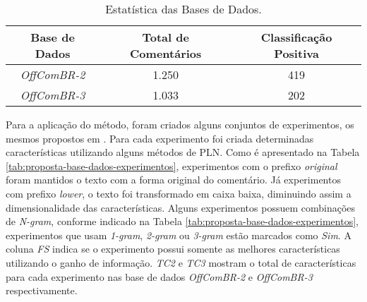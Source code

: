 \begin{table}[h]
    \centering
    {\renewcommand \arraystretch{1.25}
        \begin{tabular}{ c c c }
            \hline
            {\bf Base de Dados} & {\bf Total de Comentários} & {\bf Classificação Positiva} \\
            \hline
            
            {\it OffComBR-2} & 1.250 & 419 \\
            {\it OffComBR-3} & 1.033 & 202 \\  
            \hline
        \end{tabular} 
    }
    \caption{Estatística das Bases de Dados.}\label{tab:proposta-base-dados}
\end{table}

Para a aplicação do método, foram criados alguns conjuntos de experimentos, os mesmos propostos em \cite{Pelle2017}. Para cada experimento foi criada determinadas características utilizando alguns métodos de PLN. Como é apresentado na Tabela \ref{tab:proposta-base-dados-experimentos}, experimentos com o prefixo {\it original} foram mantidos o texto com a forma original do comentário. Já experimentos com prefixo {\it lower}, o texto foi transformado em caixa baixa, diminuindo assim a dimensionalidade das características. Alguns experimentos possuem combinações de {\it N-gram}, conforme indicado na Tabela \ref{tab:proposta-base-dados-experimentos}, experimentos que usam {\it 1-gram}, {\it 2-gram} ou {\it 3-gram} estão marcados como {\it Sim}. A coluna {\it FS} indica se o experimento possui somente as melhores características utilizando o ganho de informação. {\it TC2} e {\it TC3} mostram o total de características para cada experimento nas base de dados {\it OffComBR-2} e {\it OffComBR-3} respectivamente.     

